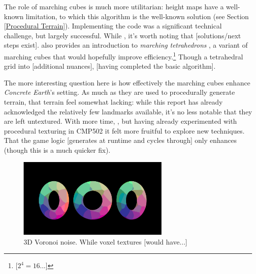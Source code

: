\documentclass[a4paper, 11pt]{article}
\begin{document}
\begin{flushleft}
\vspace{5pt}\noindent
The role of marching cubes is much more utilitarian: height maps have a well-known limitation, to which this algorithm is the well-known solution (see Section \ref{Procedural Terrain}). Implementing the code was a significant technical challenge, but largely successful. While , it's worth noting that [solutions/next steps exist]. \citeauthor{bourkeMarchingTetrahedrons} also provides an introduction to \textit{marching tetrahedrons} \citeyearpar{bourkeMarchingTetrahedrons}, a variant of marching cubes that would hopefully improve efficiency.\footnote{[$2^4 = 16$...]} %
Though a  tetrahedral grid into  [additional nuances], [having completed the basic algorithm]. %

\vspace{5pt}\noindent
The more interesting question here is how effectively the marching cubes enhance \textit{Concrete Earth}'s setting. As much as they are used to procedurally generate terrain, that terrain feel somewhat lacking: while this report has already acknowledged the relatively few landmarks available, it's no less notable that they are left untextured. With more time, , but having already experimented with procedural texturing in CMP502 it felt more fruitful to explore new techniques. That the game logic [generates at runtime and cycles through] only enhances (though this is a much quicker fix).

\vspace{5pt}\noindent
\begin{figure}[h]
\centering
\includegraphics[width=0.66\textwidth]{Euclidean Voronoi Voxel}
\caption{3D Voronoi noise. While voxel textures [would have...]}
\label{Euclidean Voronoi Voxel}
\end{figure}


\end{flushleft}
\end{document}
